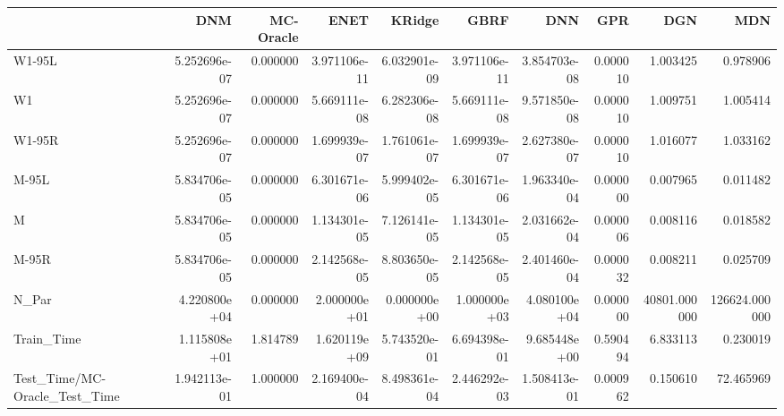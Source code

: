 \begin{tabular}{lrrrrrrrrr}
\toprule
{} &           DNM &  MC-Oracle &          ENET &        KRidge &          GBRF &           DNN &       GPR &           DGN &            MDN \\
\midrule
W1-95L                        &  5.252696e-07 &   0.000000 &  3.971106e-11 &  6.032901e-09 &  3.971106e-11 &  3.854703e-08 &  0.000010 &      1.003425 &       0.978906 \\
W1                            &  5.252696e-07 &   0.000000 &  5.669111e-08 &  6.282306e-08 &  5.669111e-08 &  9.571850e-08 &  0.000010 &      1.009751 &       1.005414 \\
W1-95R                        &  5.252696e-07 &   0.000000 &  1.699939e-07 &  1.761061e-07 &  1.699939e-07 &  2.627380e-07 &  0.000010 &      1.016077 &       1.033162 \\
M-95L                         &  5.834706e-05 &   0.000000 &  6.301671e-06 &  5.999402e-05 &  6.301671e-06 &  1.963340e-04 &  0.000000 &      0.007965 &       0.011482 \\
M                             &  5.834706e-05 &   0.000000 &  1.134301e-05 &  7.126141e-05 &  1.134301e-05 &  2.031662e-04 &  0.000006 &      0.008116 &       0.018582 \\
M-95R                         &  5.834706e-05 &   0.000000 &  2.142568e-05 &  8.803650e-05 &  2.142568e-05 &  2.401460e-04 &  0.000032 &      0.008211 &       0.025709 \\
N\_Par                         &  4.220800e+04 &   0.000000 &  2.000000e+01 &  0.000000e+00 &  1.000000e+03 &  4.080100e+04 &  0.000000 &  40801.000000 &  126624.000000 \\
Train\_Time                    &  1.115808e+01 &   1.814789 &  1.620119e+09 &  5.743520e-01 &  6.694398e-01 &  9.685448e+00 &  0.590494 &      6.833113 &       0.230019 \\
Test\_Time/MC-Oracle\_Test\_Time &  1.942113e-01 &   1.000000 &  2.169400e-04 &  8.498361e-04 &  2.446292e-03 &  1.508413e-01 &  0.000962 &      0.150610 &      72.465969 \\
\bottomrule
\end{tabular}
